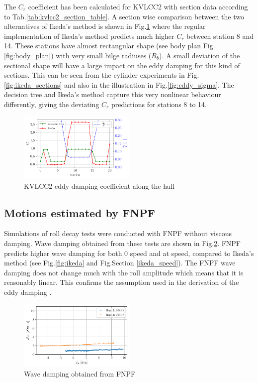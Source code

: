 The $C_r$ coefficient has been calculated for KVLCC2 with section data
according to Tab.\ref{tab:kvlcc2_section_table}. A section wise
comparison between the two alternatives of Ikeda's method is shown in
Fig.\ref{fig:kvlcc2_eddy} where the regular implementation of
Ikeda's method predicts much higher $C_r$ between station 8 and 14.
These stations have almost rectangular shape (see body plan
Fig.\ref{fig:body_plan}) with very small bilge radiuses
($R_b$). A small deviation of the sectional shape will have a large
impact on the eddy damping for this kind of sections. This can be seen
from the cylinder experiments in Fig.\ref{fig:ikeda_sections}
and also in the illustration in Fig.\ref{fig:eddy_sigma}. The
decision tree and Ikeda's method capture this very nonlinear behaviour
differently, giving the deviating $C_r$ predictions for stations 8 to
14.
\begin{figure}[H]
\begin{center}\includegraphics[width = 0.5\textwidth]{figures/kvlcc2_eddy.pdf}\end{center}
\vspace{-1cm}
\caption{KVLCC2 eddy damping coefficient along the hull}
\label{fig:kvlcc2_eddy}
\end{figure}
\subsection*{Motions estimated by FNPF}\label{motions-estimated-by-fnpf}
Simulations of roll decay tests were conducted with FNPF without viscous
damping. Wave damping obtained from these tests are shown in
Fig.\ref{fig:fnpf}. FNPF predicts higher wave damping for both 0
speed and at speed, compared to Ikeda's method (see
Fig.\ref{fig:ikeda} and Fig.Section \ref{ikeda_speed}). The FNPF
wave damping does not change much with the roll amplitude which means
that it is reasonably linear. This confirms the assumption used in the
derivation of the eddy damping \citep{7505983/4AFVVGNT}.
\begin{figure}[H]
\begin{center}\includegraphics[width = 0.5\textwidth]{figures/fnpf.pdf}\end{center}
\vspace{-1cm}
\caption{Wave damping obtained from FNPF}
\label{fig:fnpf}
\end{figure}
